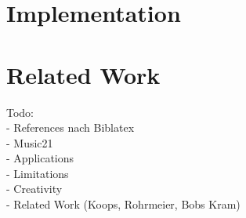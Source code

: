\documentclass[a4paper,11pt, fleqn]{article}
\date{\today}
\author{Thats Me}
\begin{document}

\tableofcontents 

\clearpage


\clearpage
\section{Implementation}









\clearpage
\section{Related Work}



\clearpage


\noindent
Todo:\\
- References nach Biblatex\\
- Music21\\
- Applications\\
- Limitations\\
- Creativity\\
- Related Work (Koops, Rohrmeier, Bobs Kram)

%

\printbibliography
\end{document}

